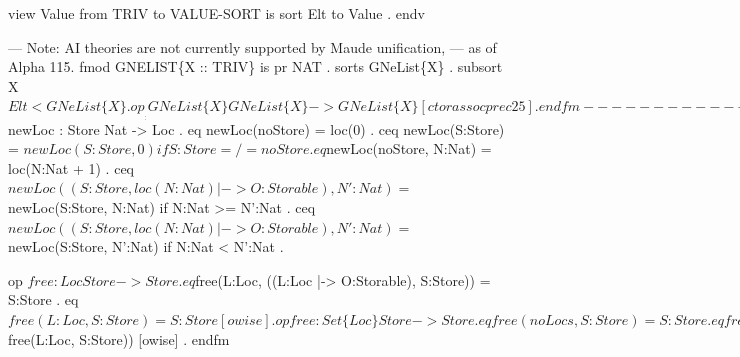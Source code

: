 \documentclass{llncs}%
\begin{document}
view Value from TRIV to VALUE-SORT is
    sort Elt to Value . 
endv

--- Note: AI theories are not currently supported by Maude unification, 
--- as of Alpha 115. 
fmod GNELIST\{X :: TRIV\} is
    pr NAT .
    sorts GNeList\{X\} .
    subsort X$Elt < GNeList\{X\} .

    op __ : GNeList\{X\} GNeList\{X\} -> GNeList\{X\} [ctor assoc prec 25] . 
endfm

--------------------------------------------------------------
--- GSMC semantics for basic programming language constructs .

fmod VALUE-STACK is
    pr GNELIST\{Value\} * (sort GNeList\{Value\} to NeValueStack) .
    sort ValueStack .
    subsort NeValueStack < ValueStack .
    op evs : -> ValueStack . 
    op __ : ValueStack ValueStack -> ValueStack [ditto] .       
endfm

fmod CONTROL-STACK is
    pr GNELIST\{Control\} * (sort GNeList\{Control\} to NeControlStack) .
    sort ControlStack .
    subsort NeControlStack < ControlStack .
    op ecs : -> ControlStack . 
    op __ : ControlStack ControlStack -> ControlStack [ditto] .         
endfm

fmod STORE-SORTS is
    sorts Loc Storable . 
endfm

view Loc from TRIV to STORE-SORTS is
    sort Elt to Loc . 
endv

view Storable from TRIV to STORE-SORTS is
    sort Elt to Storable . 
endv

fmod STORE is
    pr NAT .
    ex MAP\{Loc,Storable\} * (sort Entry\{Loc,Storable\} to Cell,
       sort Map\{Loc,Storable\} to Store,
       op undefined to undefloc, op empty to noStore).
    ex SET\{Loc\} * (op empty to noLocs) .

    op loc : Nat -> Loc [ctor] .
    op newLoc : Store -> Loc .
    op $newLoc : Store Nat -> Loc .
    eq newLoc(noStore) = loc(0) .
    ceq newLoc(S:Store) = $newLoc(S:Store, 0) if S:Store =/= noStore .
    eq $newLoc(noStore, N:Nat) = loc(N:Nat + 1) .
    ceq $newLoc((S:Store, loc(N:Nat) |-> O:Storable), N':Nat) =
        $newLoc(S:Store, N:Nat) if N:Nat >= N':Nat .
    ceq $newLoc((S:Store, loc(N:Nat) |-> O:Storable), N':Nat) =
        $newLoc(S:Store, N':Nat) if N:Nat < N':Nat .

    op $free : Loc Store -> Store .
    eq $free(L:Loc, ((L:Loc |-> O:Storable), S:Store)) = S:Store .
    eq $free(L:Loc, S:Store) = S:Store [owise] .

    op free : Set\{Loc\} Store -> Store .
    eq free(noLocs, S:Store) = S:Store .
    eq free((L:Loc , SL:Set\{Loc\}), S:Store) =
       free(SL:Set\{Loc\}, $free(L:Loc, S:Store)) [owise] . 
endfm
\end{document}
